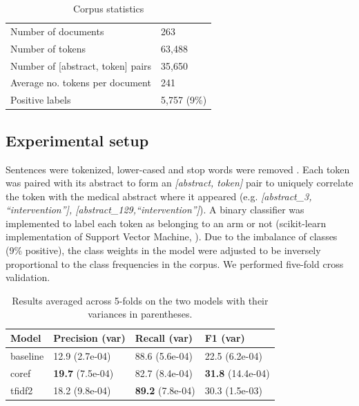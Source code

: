 \begin{table}[h]
  \begin{tabular}{l|l}
      \toprule
      Number of documents & 263 \\
      Number of tokens & 63,488 \\
      Number of [abstract, token] pairs & 35,650 \\
      Average no. tokens per document & 241 \\
      Positive labels & 5,757 (9\%) \\\bottomrule
  \end{tabular}
  \caption{Corpus statistics}
  \label{tab:3}
\end{table}
\vspace{-1em}

\subsection{Experimental setup}

Sentences were tokenized, lower-cased and stop words were removed . Each token was paired with its abstract to form an \textit{[abstract, token]} pair to uniquely correlate the token with the medical abstract where it appeared (e.g. \textit{[abstract\_3, ``intervention''], [abstract\_129,``intervention'']}). A binary classifier was implemented to label each token as belonging to an arm or not (scikit-learn implementation of Support Vector Machine, ). Due to the imbalance of classes (9\% positive), the class weights in the model were adjusted to be inversely proportional to the class frequencies in the corpus. We performed five-fold cross validation.

\begin{table}[ht]
  \centering
    \begin{tabular}{llll}
        \toprule
        Model & Precision (var) & Recall (var)& F1 (var)\\\midrule
        baseline & 12.9 (2.7e-04) & 88.6 (5.6e-04) & 22.5 (6.2e-04)\\
        coref & \textbf{19.7} (7.5e-04) & 82.7 (8.4e-04) & \textbf{31.8} (14.4e-04)\\
        tfidf2 & 18.2 (9.8e-04) & \textbf{89.2} (7.8e-04) & 30.3 (1.5e-03) \\\bottomrule
    \end{tabular}
    \caption{Results averaged across 5-folds on the two models with their variances in parentheses.}
  \label{tab:5}
\end{table}


